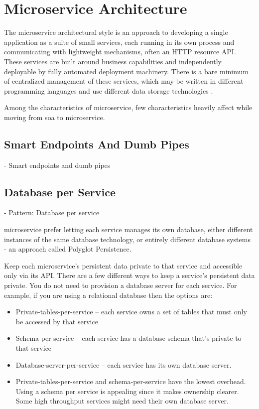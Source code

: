 \section{Microservice Architecture}

The microservice architectural style is an approach to developing a single application as a suite of small services, each running in its own process and communicating with lightweight mechanisms, often an HTTP resource API. These services are built around business capabilities and independently deployable by fully automated deployment machinery. There is a bare minimum of centralized management of these services, which may be written in different programming languages and use different data storage technologies \cite{LewisMicroservices}.

Among the characteristics of \acrfull{microservice}, few characteristics heavily affect while moving from \acrshort{soa} to \acrshort{microservice}.
\subsection{Smart Endpoints And Dumb Pipes}
\label{subse:smart_endpoints}
- Smart endpoints and dumb pipes \cite{LewisMicroservicesPipes}

\subsection{Database per Service}
\label{subse:database_per_service}
- Pattern: Database per service \cite{LewisMicroservicesManagement}

  \acrshort{microservice} prefer letting each service manages its own database, either different instances of the same database technology, or entirely different database systems - an approach called Polyglot Persistence.
  
  \cite{RichardsonMicroservicesService}
  Keep each microservice’s persistent data private to that service and accessible only via its API. 
There are a few different ways to keep a service’s persistent data private. You do not need to provision a database server for each service. For example, if you are using a relational database then the options are:
\begin{itemize}
    \item Private-tables-per-service – each service owns a set of tables that must only be accessed by that service
    \item Schema-per-service – each service has a database schema that’s private to that service
    \item Database-server-per-service – each service has its own database server.
    \item Private-tables-per-service and schema-per-service have the lowest overhead. Using a schema per service is appealing since it makes ownership clearer. Some high throughput services might need their own database server.
\end{itemize}

